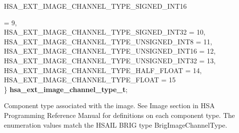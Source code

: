 \documentclass[final]{book}
\newcommand{\reftyp}[1]{#1}
\newcommand{\refenu}[1]{\reftyp{#1}}
\newenvironment{mylongtable}{\rowcolors{0}{lightgray}{lightgray}\longtable} {
\endlongtable}
\begin{document}
\begin{mylongtable}{@{}p{\textwidth}}
\hspace{1.7em}\hypertarget{group__ext-images_1ggaa143aa6feeaf24103b886c571ace568fa94b5591edcfac1939f541c48a6f84400}{\refenu{HSA_\-EXT_\-IMAGE_\-CHANNEL_\-TYPE_\-SIGNED_\-INT16}} = 9,\\
\hspace{1.7em}\hypertarget{group__ext-images_1ggaa143aa6feeaf24103b886c571ace568fab58308c224a7d513ecbf0ffd51846ff2}{\refenu{HSA_\-EXT_\-IMAGE_\-CHANNEL_\-TYPE_\-SIGNED_\-INT32}} = 10,\\
\hspace{1.7em}\hypertarget{group__ext-images_1ggaa143aa6feeaf24103b886c571ace568fad5a41c0a19a7cb34f4343db6cf757b7a}{\refenu{HSA_\-EXT_\-IMAGE_\-CHANNEL_\-TYPE_\-UNSIGNED_\-INT8}} = 11,\\
\hspace{1.7em}\hypertarget{group__ext-images_1ggaa143aa6feeaf24103b886c571ace568fa1779271b7ca06132b05918e5a72a2a85}{\refenu{HSA_\-EXT_\-IMAGE_\-CHANNEL_\-TYPE_\-UNSIGNED_\-INT16}} = 12,\\
\hspace{1.7em}\hypertarget{group__ext-images_1ggaa143aa6feeaf24103b886c571ace568faf925e28a04ef0162badd74c43b324ec5}{\refenu{HSA_\-EXT_\-IMAGE_\-CHANNEL_\-TYPE_\-UNSIGNED_\-INT32}} = 13,\\
\hspace{1.7em}\hypertarget{group__ext-images_1ggaa143aa6feeaf24103b886c571ace568fa71200bfc55d6373e117594a624472973}{\refenu{HSA_\-EXT_\-IMAGE_\-CHANNEL_\-TYPE_\-HALF_\-FLOAT}} = 14,\\
\hspace{1.7em}\hypertarget{group__ext-images_1ggaa143aa6feeaf24103b886c571ace568fa4b06498e72cfae3bffd55e5c7a483576}{\refenu{HSA_\-EXT_\-IMAGE_\-CHANNEL_\-TYPE_\-FLOAT}} = 15\\
\} \hypertarget{group__ext-images_1gaa143aa6feeaf24103b886c571ace568f}{\textbf{hsa_\-ext_\-image_\-channel_\-type_\-t}};\rule[-2ex]{0pt}{0pt}\end{mylongtable}
\vspace{-2mm}Component type associated with the image. See Image section in HSA Programming Reference Manual for definitions on each component type. The enumeration values match the HSAIL BRIG type BrigImageChannelType.
\end{document}

